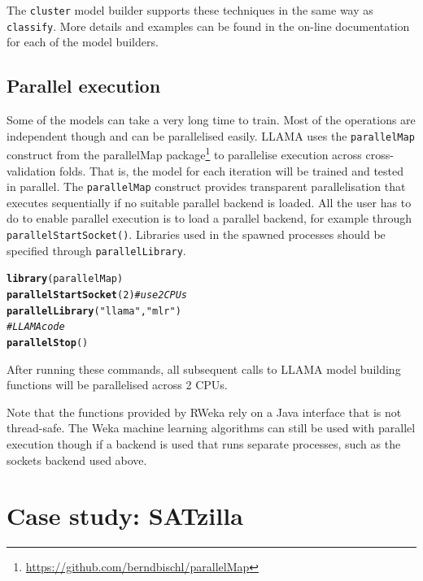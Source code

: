 \documentclass{article}\usepackage[]{graphicx}\usepackage[]{color}
\makeatletter
\newcommand{\hlnum}[1]{\textcolor[rgb]{0.686,0.059,0.569}{#1}}%
\newcommand{\hlstr}[1]{\textcolor[rgb]{0.192,0.494,0.8}{#1}}%
\newcommand{\hlcom}[1]{\textcolor[rgb]{0.678,0.584,0.686}{\textit{#1}}}%
\newcommand{\hlstd}[1]{\textcolor[rgb]{0.345,0.345,0.345}{#1}}%
\newcommand{\hlkwd}[1]{\textcolor[rgb]{0.737,0.353,0.396}{\textbf{#1}}}%
\newenvironment{kframe}{%
 \def\at@end@of@kframe{}%
 \ifinner\ifhmode%
  \def\at@end@of@kframe{\end{minipage}}%
  \begin{minipage}{\columnwidth}%
 \fi\fi%
 \def\FrameCommand##1{\hskip\@totalleftmargin \hskip-\fboxsep
 \colorbox{shadecolor}{##1}\hskip-\fboxsep
     \hskip-\linewidth \hskip-\@totalleftmargin \hskip\columnwidth}%
 \MakeFramed {\advance\hsize-\width
   \@totalleftmargin\z@ \linewidth\hsize
   \@setminipage}}%
 {\par\unskip\endMakeFramed%
 \at@end@of@kframe}
\newenvironment{knitrout}{}{} %
\makeatother
\begin{document}
The \lstinline{cluster} model builder supports these techniques in the same way
as \lstinline{classify}. More details and examples can be found in the on-line
documentation for each of the model builders.

\subsection{Parallel execution}\label{sec:parallel}

Some of the models can take a very long time to train. Most of the operations
are independent though and can be parallelised easily. LLAMA uses the
\lstinline{parallelMap} construct from the parallelMap
package\footnote{\url{https://github.com/berndbischl/parallelMap}} to
parallelise execution across cross-validation folds. That is, the model for each
iteration will be trained and tested in parallel. The \lstinline{parallelMap}
construct provides transparent parallelisation that executes sequentially if no
suitable parallel backend is loaded. All the user has to do to enable parallel
execution is to load a parallel backend, for example through
\lstinline{parallelStartSocket()}. Libraries used in the spawned processes
should be specified through \lstinline{parallelLibrary}.

\begin{knitrout}
\color{fgcolor}\begin{kframe}
\begin{alltt}
\hlkwd{library}\hlstd{(parallelMap)}
\hlkwd{parallelStartSocket}\hlstd{(}\hlnum{2}\hlstd{)}  \hlcom{# use 2 CPUs}
\hlkwd{parallelLibrary}\hlstd{(}\hlstr{"llama"}\hlstd{,} \hlstr{"mlr"}\hlstd{)}
\hlcom{# LLAMA code}
\hlkwd{parallelStop}\hlstd{()}
\end{alltt}
\end{kframe}
\end{knitrout}

After running these commands, all subsequent calls to LLAMA model building
functions will be parallelised across 2 CPUs.

Note that the functions provided by RWeka rely on a Java interface that is not
thread-safe. The Weka machine learning algorithms can still be used with
parallel execution though if a backend is used that runs separate processes,
such as the sockets backend used above.


\section{Case study: SATzilla}\label{sec:case:satzilla}
\end{document}
